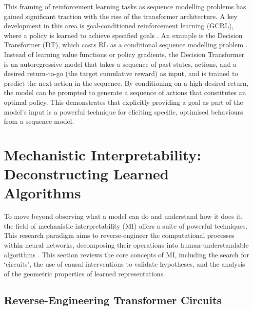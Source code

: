 This framing of reinforcement learning tasks as sequence modelling problems has gained significant traction with the rise of the transformer architecture. A key development in this area is goal-conditioned reinforcement learning (GCRL), where a policy is learned to achieve specified goals \citep{liu2022GCLR}. An example is the Decision Transformer (DT), which casts RL as a conditional sequence modelling problem \citep{DT}. Instead of learning value functions or policy gradients, the Decision Transformer is an autoregressive model that takes a sequence of past states, actions, and a desired return-to-go (the target cumulative reward) as input, and is trained to predict the next action in the sequence. By conditioning on a high desired return, the model can be prompted to generate a sequence of actions that constitutes an optimal policy. This demonstrates that explicitly providing a goal as part of the model's input is a powerful technique for eliciting specific, optimised behaviours from a sequence model.

\section{Mechanistic Interpretability: Deconstructing Learned Algorithms}

To move beyond observing what a model can do and understand how it does it, the field of mechanistic interpretability (MI) offers a suite of powerful techniques. This research paradigm aims to reverse-engineer the computational processes within neural networks, decomposing their operations into human-understandable algorithms \cite{rai2025}. This section reviews the core concepts of MI, including the search for `circuits', the use of causal interventions to validate hypotheses, and the analysis of the geometric properties of learned representations.

\subsection{Reverse-Engineering Transformer Circuits}

